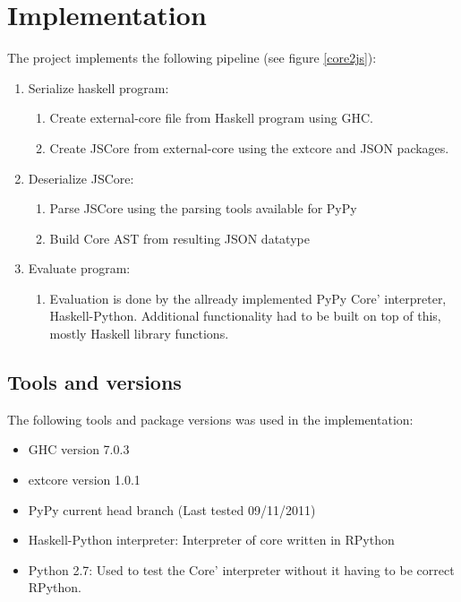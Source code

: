 
\section{Implementation}


The project implements the following pipeline (see figure \ref{core2js}):
\begin{enumerate}
\item Serialize haskell program: 
  \begin{enumerate}
  \item Create external-core file from Haskell program using GHC.
  \item Create JSCore from external-core using the extcore and JSON packages.
  \end{enumerate}
\item Deserialize JSCore:
  \begin{enumerate}
  \item Parse JSCore using the parsing tools available for PyPy
  \item Build Core AST from resulting JSON datatype
  \end{enumerate}
\item Evaluate program:
  \begin{enumerate}
  \item Evaluation is done by the allready implemented PyPy Core' interpreter,
  Haskell-Python. Additional functionality had to be built on top of this, mostly 
  Haskell library functions.
  \end {enumerate}
\end{enumerate}

\subsection{Tools and versions}

The following tools and package versions was used in the implementation:

\begin{itemize}
\item GHC version 7.0.3
\item extcore version 1.0.1
\item PyPy current head branch (Last tested 09/11/2011)
\item Haskell-Python interpreter: Interpreter of core written in RPython
\item Python 2.7: Used to test the Core' interpreter without it having to be correct RPython.
\end{itemize}

